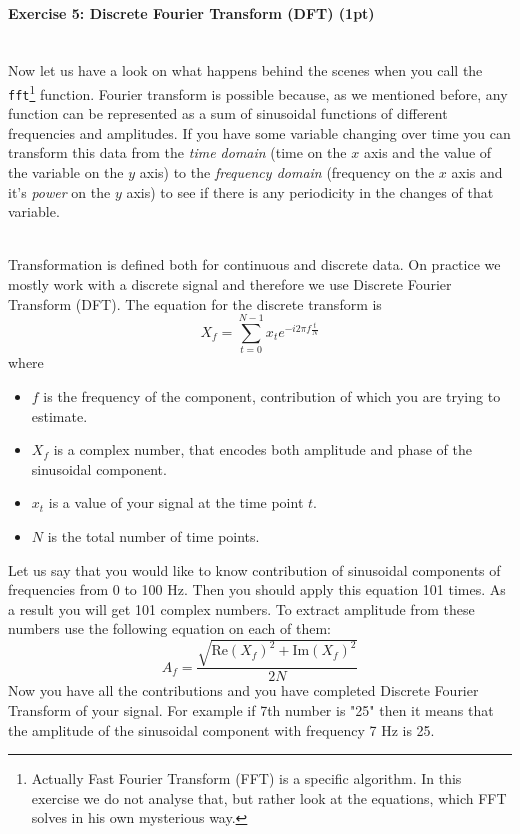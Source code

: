 \documentclass[a4paper,11pt]{article}
\newenvironment{exercise}[3]{\paragraph{Exercise #1: #2 (#3pt)}\ \\}{
\medskip}
\begin{document}
%
%
\begin{exercise}{5}{Discrete Fourier Transform (DFT)}{1}
Now let us have a look on what happens behind the scenes when you call the \texttt{fft}\footnote{Actually Fast Fourier Transform (FFT) is a specific algorithm. In this exercise we do not analyse that, but rather look at the equations, which FFT solves in his own mysterious way.} function. Fourier transform is possible because, as we mentioned before, any function can be represented as a sum of sinusoidal functions of different frequencies and amplitudes. If you have some variable changing over time you can transform this data from the \emph{time domain} (time on the $x$ axis and the value of the variable on the $y$ axis) to the \emph{frequency domain} (frequency on the $x$ axis and it's \emph{power} on the $y$ axis) to see if there is any periodicity in the changes of that variable.

\ \\
Transformation is defined both for continuous and discrete data. On practice we mostly work with a discrete signal and therefore we use Discrete Fourier Transform (DFT). The equation for the discrete transform is
$$X_f = \displaystyle\sum_{t=0}^{N-1}x_t e^{-i2\pi f\frac{t}{N}}$$
where
\begin{itemize}
\itemsep 0em
	\item $f$ is the frequency of the component, contribution of which you are trying to estimate.
	\item $X_f$ is a complex number, that encodes both amplitude and phase of the sinusoidal component.
	\item $x_t$ is a value of your signal at the time point $t$.
	\item $N$ is the total number of time points.
\end{itemize}
Let us say that you would like to know contribution of sinusoidal components of frequencies from 0 to 100 Hz. Then you should apply this equation 101 times. As a result you will get 101 complex numbers.
To extract amplitude from these numbers use the following equation on each of them:
$$A_f = \frac{\sqrt{\text{Re}(X_f)^2 + \text{Im}(X_f)^2}}{2N}$$
Now you have all the contributions and you have completed Discrete Fourier Transform of your signal. For example if 7th number is "25" then it means that the amplitude of the sinusoidal component with frequency 7 Hz is 25.


\end{exercise}
\end{document}
